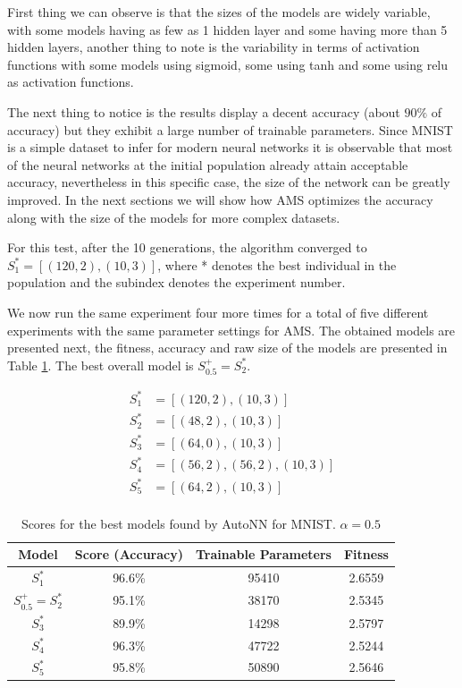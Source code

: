 \documentclass[journal]{IEEEtran}
\begin{document}
First thing we can observe is that the sizes of the models are widely variable, with some models having as few as 1 hidden layer and some having more than 5 hidden layers, another thing to note is the variability in terms of activation functions with some models using sigmoid, some using tanh and some using relu as activation functions.

The next thing to notice is the results display a decent accuracy (about $90\%$ of accuracy) but they exhibit a large number of trainable parameters. Since MNIST is a simple dataset to infer for modern neural networks it is observable that most of the neural networks at the initial population already attain acceptable accuracy, nevertheless in this specific case, the size of the network can be greatly improved. In the next sections we will show how AMS optimizes the accuracy along with the size of the models for more complex datasets.

For this test, after the 10 generations, the algorithm converged to $S^*_1 = \left[ (120, 2), (10, 3) \right]$, where * denotes the best individual in the population and the subindex denotes the experiment number.

We now run the same experiment four more times for a total of five different experiments with the same parameter settings for AMS. The obtained models are presented next, the fitness, accuracy and raw size of the models are presented in Table \ref{table:autonn_mnist_1}. The best overall model is $S^+_{0.5} = S^*_2$.

\begin{align*}
S^*_1 & = \left[ (120, 2), (10, 3) \right] \\
S^*_2 & = \left[ (48, 2), (10, 3) \right] \\
S^*_3 & = \left[ (64, 0), (10, 3) \right] \\
S^*_4 & = \left[ (56, 2), (56, 2),  (10, 3) \right] \\
S^*_5 & = \left[ (64, 2), (10, 3) \right] \\
\end{align*}

\begin{table}[!htb]
\begin{center}
\begin{tabular}{| c | c | c | c |}
\hline
Model & Score (Accuracy) & Trainable Parameters & Fitness\\
\hline
$S^*_1$ & 96.6\% & 95410 & 2.6559\\
$S^+_{0.5} = S^*_2$ & 95.1\% & 38170 & 2.5345\\
$S^*_3$ & 89.9\% & 14298 & 2.5797\\
$S^*_4$ & 96.3\% & 47722 & 2.5244\\
$S^*_5$ & 95.8\% & 50890 & 2.5646\\
\hline
\end{tabular}
\end{center}
\caption{Scores for the best models found by AutoNN for MNIST. $\alpha = 0.5$}
\label{table:autonn_mnist_1}
\end{table}
\end{document}
